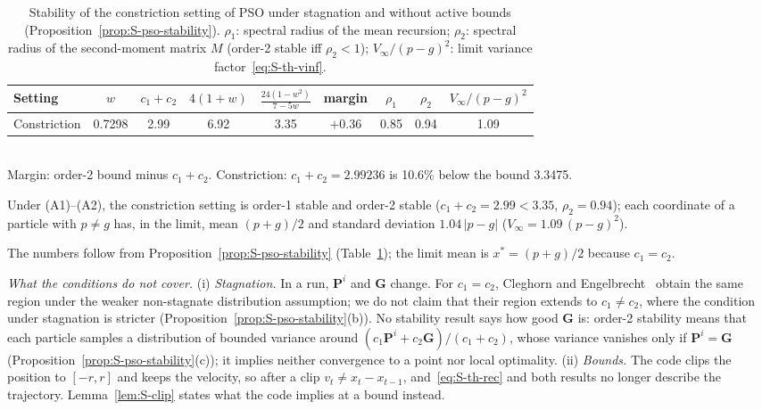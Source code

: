 \begin{table}[!htbp]
\centering
\caption{Stability of the constriction setting of PSO under stagnation and without active bounds (Proposition~\ref{prop:S-pso-stability}). $\rho_1$: spectral radius of the mean recursion; $\rho_2$: spectral radius of the second-moment matrix $M$ (order-2 stable iff $\rho_2<1$); $V_\infty/(p-g)^2$: limit variance factor~\eqref{eq:S-th-vinf}.}
\label{tab:S-th-settings}
\begin{tabular}{lcccccccc}
\toprule
Setting & $w$ & $c_1+c_2$ & $4(1+w)$ & $\frac{24(1-w^2)}{7-5w}$ & margin & $\rho_1$ & $\rho_2$ & $V_\infty/(p-g)^2$\\
\midrule
Constriction & 0.7298 & 2.99 & 6.92 & 3.35 & $+0.36$ & 0.85 & 0.94 & 1.09\\
\bottomrule
\end{tabular}
\\[2pt]{\footnotesize Margin: order-2 bound minus $c_1+c_2$. Constriction: $c_1+c_2=2.99236$ is 10.6\% below the bound 3.3475.}
\end{table}

\begin{thS}
\label{prop:S-constriction}
Under (A1)--(A2), the constriction setting is order-1 stable and order-2 stable ($c_1+c_2=2.99<3.35$, $\rho_2=0.94$); each coordinate of a particle with $p\ne g$ has, in the limit, mean $(p+g)/2$ and standard deviation $1.04\,\lvert p-g\rvert$ ($V_\infty=1.09\,(p-g)^2$).
\end{thS}
\begin{thSproof}
The numbers follow from Proposition~\ref{prop:S-pso-stability} (Table~\ref{tab:S-th-settings}); the limit mean is $x^*=(p+g)/2$ because $c_1=c_2$.
\end{thSproof}

\emph{What the conditions do not cover.} (i) \emph{Stagnation.} In a run, $\mathbf P^i$ and $\mathbf G$ change. For $c_1=c_2$, Cleghorn and Engelbrecht~\cite{Cleghorn2018} obtain the same region under the weaker non-stagnate distribution assumption; we do not claim that their region extends to $c_1\ne c_2$, where the condition under stagnation is stricter (Proposition~\ref{prop:S-pso-stability}(b)). No stability result says how good $\mathbf G$ is: order-2 stability means that each particle samples a distribution of bounded variance around $(c_1\mathbf P^i+c_2\mathbf G)/(c_1+c_2)$, whose variance vanishes only if $\mathbf P^i=\mathbf G$ (Proposition~\ref{prop:S-pso-stability}(c)); it implies neither convergence to a point nor local optimality. (ii) \emph{Bounds.} The code clips the position to $[-r,r]$ and keeps the velocity, so after a clip $v_t\ne x_t-x_{t-1}$, and~\eqref{eq:S-th-rec} and both results no longer describe the trajectory. Lemma~\ref{lem:S-clip} states what the code implies at a bound instead.

